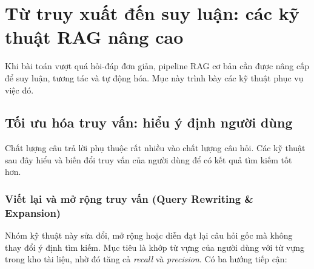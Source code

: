 

\section{Từ truy xuất đến suy luận: các kỹ thuật RAG nâng cao}
\label{sec:reasoning_rag}

Khi bài toán vượt quá hỏi-đáp đơn giản, pipeline RAG cơ bản cần được nâng cấp để suy luận, tương tác và tự động hóa. Mục này trình bày các kỹ thuật phục vụ việc đó.

\subsection{Tối ưu hóa truy vấn: hiểu ý định người dùng}
\label{ssec:advanced_query_understanding}
Chất lượng câu trả lời phụ thuộc rất nhiều vào chất lượng câu hỏi. Các kỹ thuật sau đây hiểu và biến đổi truy vấn của người dùng để có kết quả tìm kiếm tốt hơn.

\subsubsection{Viết lại và mở rộng truy vấn (Query Rewriting \& Expansion)}
\label{sssec:query_rewriting}
Nhóm kỹ thuật này sửa đổi, mở rộng hoặc diễn đạt lại câu hỏi gốc mà không thay đổi ý định tìm kiếm. Mục tiêu là khớp từ vựng của người dùng với từ vựng trong kho tài liệu, nhờ đó tăng cả \textit{recall} và \textit{precision}. Có ba hướng tiếp cận:


